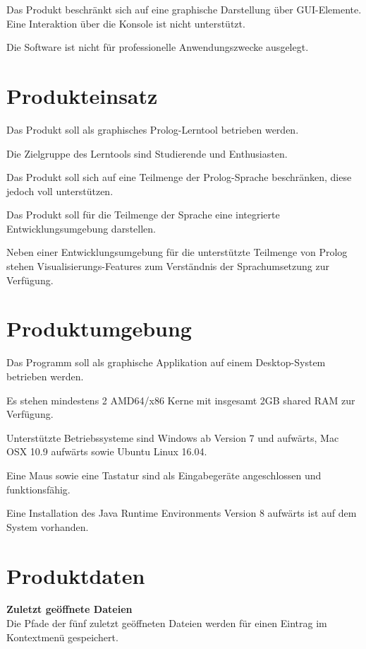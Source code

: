 \documentclass[parskip=full,11pt,twoside]{scrartcl}
\begin{document}
Das Produkt beschränkt sich auf eine graphische Darstellung über GUI-Elemente. Eine Interaktion über die Konsole ist nicht unterstützt.


Die Software ist nicht für professionelle Anwendungszwecke ausgelegt.

\pagebreak
\section{Produkteinsatz}

Das Produkt soll als graphisches Prolog-Lerntool betrieben werden.

Die Zielgruppe des Lerntools sind Studierende und Enthusiasten.

Das Produkt soll sich auf eine Teilmenge der Prolog-Sprache beschränken, diese jedoch voll unterstützen.

Das Produkt soll für die Teilmenge der Sprache eine integrierte Entwicklungsumgebung darstellen.

Neben einer Entwicklungsumgebung für die unterstützte Teilmenge von Prolog stehen Visualisierungs-Features zum Verständnis der Sprachumsetzung zur Verfügung.

\section{Produktumgebung}

Das Programm soll als graphische Applikation auf einem Desktop-System betrieben werden.

Es stehen mindestens 2 AMD64/x86 Kerne mit insgesamt 2GB shared RAM zur Verfügung.

Unterstützte Betriebssysteme sind Windows ab Version 7 und aufwärts, Mac OSX 10.9 aufwärts sowie Ubuntu Linux 16.04.

Eine Maus sowie eine Tastatur sind als Eingabegeräte angeschlossen und funktionsfähig.

Eine Installation des Java Runtime Environments Version 8 aufwärts ist auf dem System vorhanden.

\newpage

\section{Produktdaten}

\textbf{Zuletzt geöffnete Dateien} \\
Die Pfade der fünf zuletzt geöffneten Dateien werden für einen Eintrag im Kontextmenü gespeichert.
\end{document}
